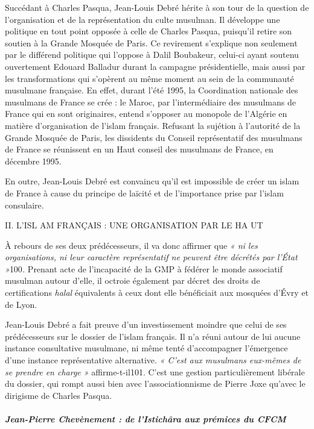 Succédant à Charles Pasqua, Jean-Louis Debré hérite à son tour de la
question de l'organisation et de la représentation du culte musulman. Il
développe une politique en tout point opposée à celle de Charles Pasqua,
puisqu'il retire son soutien à la Grande Mosquée de Paris. Ce revirement
s'explique non seulement par le différend politique qui l'oppose à Dalil
Boubakeur, celui-ci ayant soutenu ouvertement Edouard Balladur durant la
campagne présidentielle, mais aussi par les transformations qui
s'opèrent au même moment au sein de la communauté musulmane française.
En effet, durant l'été 1995, la Coordination nationale des musulmans de
France se crée : le Maroc, par l'intermédiaire des musulmans de France
qui en sont originaires, entend s'opposer au monopole de l'Algérie en
matière d'organisation de l'islam français. Refusant la sujétion à
l'autorité de la Grande Mosquée de Paris, les dissidents du Conseil
représentatif des musulmans de France se réunissent en un Haut conseil
des musulmans de France, en décembre 1995.

En outre, Jean-Louis Debré est convaincu qu'il est impossible de créer
un islam de France à cause du principe de laïcité et de l'importance
prise par l'islam consulaire.

II. L'ISL AM FRANÇAIS : UNE ORGANISATION PAR LE HA UT

À rebours de ses deux prédécesseurs, il va donc affirmer que \emph{« ni
les organisations, ni leur caractère représentatif ne peuvent être
décrétés par l'État »}100\emph{.} Prenant acte de l'incapacité de la GMP
à fédérer le monde associatif musulman autour d'elle, il octroie
également par décret des droits de certifications \emph{halal}
équivalents à ceux dont elle bénéficiait aux mosquées d'Évry et de Lyon.

Jean-Louis Debré a fait preuve d'un investissement moindre que celui de
ses prédécesseurs sur le dossier de l'islam français. Il n'a réuni
autour de lui aucune instance consultative musulmane, ni même tenté
d'accompagner l'émergence d'une instance représentative alternative.
\emph{« C'est aux musulmans eux-mêmes de se prendre en charge »}
affirme-t-il101. C'est une gestion particulièrement libérale du dossier,
qui rompt aussi bien avec l'associationnisme de Pierre Joxe qu'avec le
dirigisme de Charles Pasqua.


\hypertarget{jean-pierre-chevuxe8nement-de-listichuxe2ra-aux-pruxe9mices-du-cfcm}{%
\subparagraph{\texorpdfstring{Jean-Pierre Chevènement : de
l'\emph{Istichâra} aux prémices du
CFCM}{Jean-Pierre Chevènement : de l'Istichâra aux prémices du CFCM}}\label{jean-pierre-chevuxe8nement-de-listichuxe2ra-aux-pruxe9mices-du-cfcm}}


